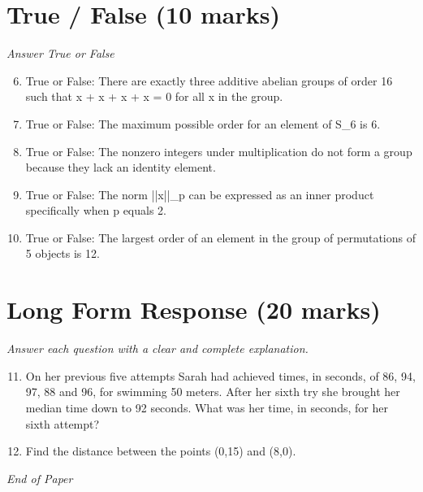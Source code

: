 \documentclass[12pt]{article}
\begin{document}
\section*{True / False (10 marks)}
\textit{Answer True or False}
\begin{enumerate}[label=\arabic*.]
\setcounter{enumi}{5}
\item True or False: There are exactly three additive abelian groups of order 16 such that x + x + x + x = 0 for all x in the group.
\item True or False: The maximum possible order for an element of S\_6 is 6.
\item True or False: The nonzero integers under multiplication do not form a group because they lack an identity element.
\item True or False: The norm ||x||\_p can be expressed as an inner product specifically when p equals 2.
\item True or False: The largest order of an element in the group of permutations of 5 objects is 12.
\end{enumerate}

\section*{Long Form Response (20 marks)}
\textit{Answer each question with a clear and complete explanation.}
\begin{enumerate}[label=\arabic*.]
\setcounter{enumi}{10}
\item On her previous five attempts Sarah had achieved times, in seconds, of 86, 94, 97, 88 and 96, for swimming 50 meters. After her sixth try she brought her median time down to 92 seconds. What was her time, in seconds, for her sixth attempt?
\item Find the distance between the points (0,15) and (8,0).
\end{enumerate}

\vfill
\noindent\textit{End of Paper}
\end{document}
